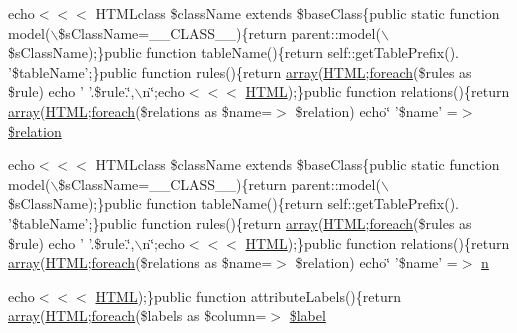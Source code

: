 \begin{DoxyCompactItemize}
\item 
echo$<$$<$$<$ HTMLclass \$className extends \$baseClass\{public static function model($\backslash$\$sClassName=\_\-\_\-CLASS\_\-\_\-)\{return parent::model($\backslash$\$sClassName);\}public function tableName()\{return self::getTablePrefix(). '\$tableName';\}public function rules()\{return \hyperlink{list_8php_aa3205d038c7f8feb5c9f01ac4dfadc88}{array}(\hyperlink{module_8php_a2c8135527015cd4586959ac7c2ffec92}{HTML};\hyperlink{example_2scripts_2check_8php_ac6aafbc4d90cd74f481282f505f6c628}{foreach}(\$rules as \$rule) echo ' '.\$rule.\char`\"{},$\backslash$n\char`\"{};echo$<$$<$$<$ \hyperlink{module_8php_a2c8135527015cd4586959ac7c2ffec92}{HTML});\}public function relations()\{return \hyperlink{list_8php_aa3205d038c7f8feb5c9f01ac4dfadc88}{array}(\hyperlink{module_8php_a2c8135527015cd4586959ac7c2ffec92}{HTML};\hyperlink{example_2scripts_2check_8php_ac6aafbc4d90cd74f481282f505f6c628}{foreach}(\$relations as \$name=$>$ \$relation) echo\char`\"{} '\$name' =$>$ \hyperlink{templates_2model_8php_a071d5a15ecc5f0db7b14df0dca0c6e47}{\$relation}
\item 
echo$<$$<$$<$ HTMLclass \$className extends \$baseClass\{public static function model($\backslash$\$sClassName=\_\-\_\-CLASS\_\-\_\-)\{return parent::model($\backslash$\$sClassName);\}public function tableName()\{return self::getTablePrefix(). '\$tableName';\}public function rules()\{return \hyperlink{list_8php_aa3205d038c7f8feb5c9f01ac4dfadc88}{array}(\hyperlink{module_8php_a2c8135527015cd4586959ac7c2ffec92}{HTML};\hyperlink{example_2scripts_2check_8php_ac6aafbc4d90cd74f481282f505f6c628}{foreach}(\$rules as \$rule) echo ' '.\$rule.\char`\"{},$\backslash$n\char`\"{};echo$<$$<$$<$ \hyperlink{module_8php_a2c8135527015cd4586959ac7c2ffec92}{HTML});\}public function relations()\{return \hyperlink{list_8php_aa3205d038c7f8feb5c9f01ac4dfadc88}{array}(\hyperlink{module_8php_a2c8135527015cd4586959ac7c2ffec92}{HTML};\hyperlink{example_2scripts_2check_8php_ac6aafbc4d90cd74f481282f505f6c628}{foreach}(\$relations as \$name=$>$ \$relation) echo\char`\"{} '\$name' =$>$ \hyperlink{templates_2model_8php_a379b45186169096aa004a82fc6fee26d}{n}
\item 
echo$<$$<$$<$ \hyperlink{module_8php_a2c8135527015cd4586959ac7c2ffec92}{HTML});\}public function attributeLabels()\{return \hyperlink{list_8php_aa3205d038c7f8feb5c9f01ac4dfadc88}{array}(\hyperlink{module_8php_a2c8135527015cd4586959ac7c2ffec92}{HTML};\hyperlink{example_2scripts_2check_8php_ac6aafbc4d90cd74f481282f505f6c628}{foreach}(\$labels as \$column=$>$ \hyperlink{templates_2model_8php_a0bf7b9a135bed8ed3dcd4c376c25b88b}{\$label}
\end{DoxyCompactItemize}


